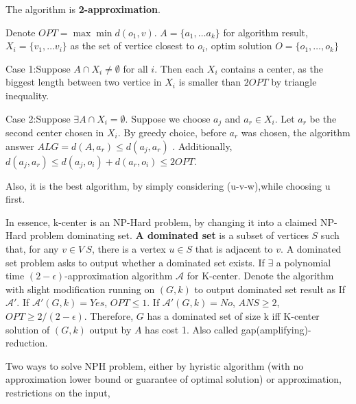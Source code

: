The algorithm is \textbf{2-approximation}.

Denote $OPT=\max \min d(o_1,v)$. $A=\{a_1,\ldots a_k\}$ for algorithm result, $X_i=\{v_1,\ldots v_i\}$ as the set of vertice closest to $o_i$, optim solution $O=\{o_1,\ldots, o_k\}$

Case 1:Suppose $A\cap X_i \neq \emptyset$ for all $i$. Then each $X_i$ contains a center, as the biggest length between two vertice in $X_i$ is smaller than $2OPT$ by triangle inequality.

Case 2:Suppose $\exists A \cap X_i =\emptyset$. Suppose we choose $a_j$ and $a_r\in X_i$. Let $a_r$ be the second center chosen in $X_i$.
By greedy choice, before $a_r$ was chosen, the algorithm answer $ALG =d(A,a_r)\leq d(a_j,a_r)$ . Additionally, $d(a_j,a_r)\leq d(a_j,o_i)+d(a_r,o_i)\leq 2OPT$.


Also, it is the best algorithm, by simply considering (u-v-w),while choosing u first.

In essence, k-center is an NP-Hard problem, by changing it into a claimed NP-Hard problem dominating set.
\textbf{A dominated set} is a subset of vertices $S$ such that, for any $v \in V \ S$, there is a
vertex $u \in S$ that is adjacent to $v$.
A dominated set problem asks to output whether a dominated set exists.
If $\exists$ a polynomial time $(2-\epsilon)$-approximation algorithm $\mathcal{A} $ for K-center. Denote the algorithm with slight modification running on $(G,k)$ to output dominated set result as If $\mathcal{A'}$.
If $\mathcal{A'}(G,k)=Yes$, $OPT\leq 1$. If $\mathcal{A'}(G,k)=No$, $ANS\geq 2$,$OPT \geq 2/(2-\epsilon)$.
Therefore, $G$ has a dominated set of size k iff K-center solution of $(G,k)$ output by $A$ has cost 1.
Also called gap(amplifying)-reduction.
\begin{remark}
Two ways to solve NPH problem, either by hyristic algorithm (with no approximation lower bound or guarantee of optimal solution) or approximation, restrictions on the input,
\end{remark}

